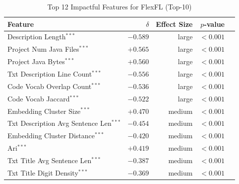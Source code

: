 \begin{table}[h]
\centering
\caption{Top 12 Impactful Features for FlexFL (Top-10)}
\label{tab:tool_features_flexfl_top10}
\begin{tabular}{lrrrr}
\toprule
Feature & $\delta$ & Effect Size & $p$-value \\
\midrule
Description Length$^{***}$ & $-0.589$ & large & $<0.001$ \\
Project Num Java Files$^{***}$ & $+0.565$ & large & $<0.001$ \\
Project Java Bytes$^{***}$ & $+0.560$ & large & $<0.001$ \\
Txt Description Line Count$^{***}$ & $-0.556$ & large & $<0.001$ \\
Code Vocab Overlap Count$^{***}$ & $-0.536$ & large & $<0.001$ \\
Code Vocab Jaccard$^{***}$ & $-0.522$ & large & $<0.001$ \\
Embedding Cluster Size$^{***}$ & $+0.470$ & medium & $<0.001$ \\
Txt Description Avg Sentence Len$^{***}$ & $-0.454$ & medium & $<0.001$ \\
Embedding Cluster Distance$^{***}$ & $-0.420$ & medium & $<0.001$ \\
Ari$^{***}$ & $+0.419$ & medium & $<0.001$ \\
Txt Title Avg Sentence Len$^{***}$ & $-0.387$ & medium & $<0.001$ \\
Txt Title Digit Density$^{***}$ & $-0.369$ & medium & $<0.001$ \\
\bottomrule
\end{tabular}
\end{table}

